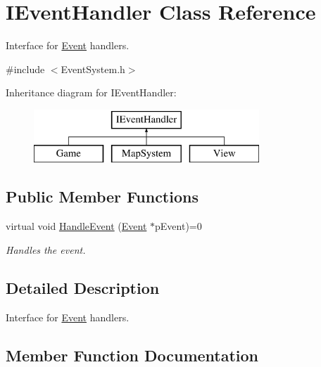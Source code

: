 \hypertarget{class_i_event_handler}{}\section{I\+Event\+Handler Class Reference}
\label{class_i_event_handler}


Interface for \mbox{\hyperlink{struct_event}{Event}} handlers.  




{\ttfamily \#include $<$Event\+System.\+h$>$}

Inheritance diagram for I\+Event\+Handler\+:\begin{figure}[H]
\begin{center}
\leavevmode
\includegraphics[height=2.000000cm]{class_i_event_handler}
\end{center}
\end{figure}
\subsection*{Public Member Functions}
\begin{DoxyCompactItemize}
\item 
virtual void \mbox{\hyperlink{class_i_event_handler_a2174b40d97b1be9b01bbdf77597dff26}{Handle\+Event}} (\mbox{\hyperlink{struct_event}{Event}} $\ast$p\+Event)=0
\begin{DoxyCompactList}\small\item\em Handles the event. \end{DoxyCompactList}\end{DoxyCompactItemize}


\subsection{Detailed Description}
Interface for \mbox{\hyperlink{struct_event}{Event}} handlers. 

\subsection{Member Function Documentation}
\mbox{\label{class_i_event_handler_a2174b40d97b1be9b01bbdf77597dff26}} 
